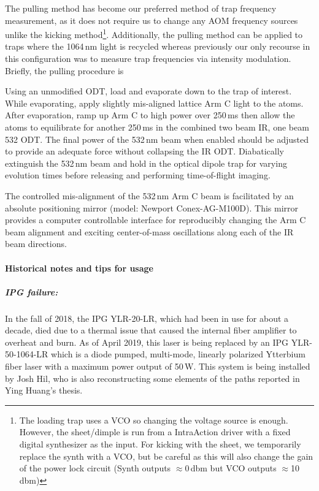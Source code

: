 The pulling method has become our preferred method of trap frequency measurement, as it does not require us to change any AOM frequency sources unlike the kicking method\footnote{The loading trap uses a VCO so changing the voltage source is enough. However, the sheet/dimple is run from a IntraAction driver with a fixed digital synthesizer as the input. For kicking with the sheet, we temporarily replace the synth with a VCO, but be careful as this will also change the gain of the power lock circuit (Synth outputs $\approx$0\,dbm but VCO outputs $\approx$10\,dbm)}.
Additionally, the pulling method can be applied to traps where the 1064\,nm light is recycled whereas previously our only recourse in this configuration was to measure trap frequencies via intensity modulation.
Briefly, the pulling procedure is 
\begin{outline}[enumerate]
	\1 Using an unmodified ODT, load and evaporate down to the trap of interest.
		\2 While evaporating, apply slightly mis-aligned lattice Arm C light to the atoms.
	\1 After evaporation, ramp up Arm C to high power over 250\,ms then allow the atoms to equilibrate for another 250\,ms in the combined two beam IR, one beam 532 ODT.
		\2 The final power of the 532\,nm beam when enabled should be adjusted to provide an adequate force without collapsing the IR ODT.
	\1 Diabatically extinguish the 532\,nm beam and hold in the optical dipole trap for varying evolution times before releasing and performing time-of-flight imaging.
\end{outline}
The controlled mis-alignment of the 532\,nm Arm C beam is facilitated by an absolute positioning mirror (model: Newport Conex-AG-M100D).
This mirror provides a computer controllable interface for reproducibly changing the Arm C beam alignment and exciting center-of-mass oscillations along each of the IR beam directions.

\paragraph{Historical notes and tips for usage}
\subparagraph{IPG failure:}
In the fall of 2018, the IPG YLR-20-LR, which had been in use for about a decade, died due to a thermal issue that caused the internal fiber amplifier to overheat and burn.
As of April 2019, this laser is being replaced by an IPG YLR-50-1064-LR which is a diode pumped, multi-mode, linearly polarized Ytterbium fiber laser with a maximum power output of 50\,W.
This system is being installed by Josh Hil, who is also reconstructing some elements of the paths reported in Ying Huang's thesis.

